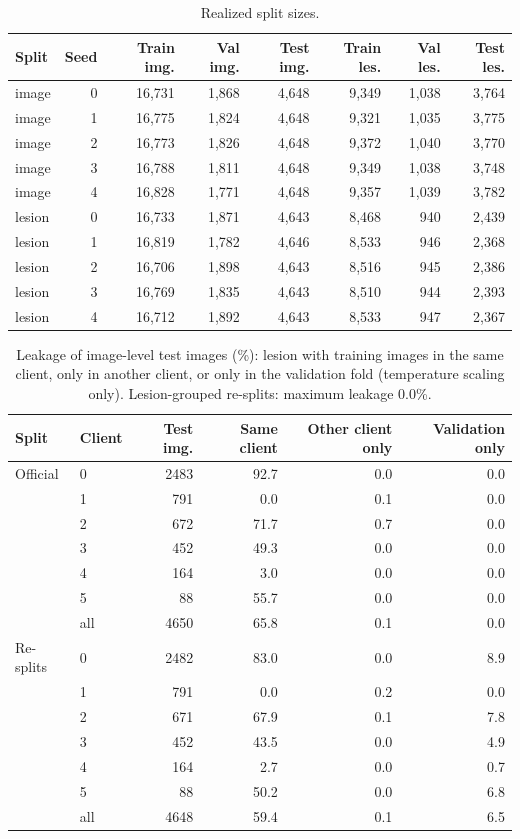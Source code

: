 \documentclass[10pt]{article}
\begin{document}
\begin{table}[!htbp]
\centering
\footnotesize
\caption{Realized split sizes.}
\label{tab:s1sizes}
\begin{tabular}{@{}lrrrrrrr@{}}
\toprule
Split & Seed & Train img. & Val img. & Test img. & Train les. & Val les. & Test les. \\
\midrule
image & 0 & 16,731 & 1,868 & 4,648 & 9,349 & 1,038 & 3,764 \\
image & 1 & 16,775 & 1,824 & 4,648 & 9,321 & 1,035 & 3,775 \\
image & 2 & 16,773 & 1,826 & 4,648 & 9,372 & 1,040 & 3,770 \\
image & 3 & 16,788 & 1,811 & 4,648 & 9,349 & 1,038 & 3,748 \\
image & 4 & 16,828 & 1,771 & 4,648 & 9,357 & 1,039 & 3,782 \\
lesion & 0 & 16,733 & 1,871 & 4,643 & 8,468 & 940 & 2,439 \\
lesion & 1 & 16,819 & 1,782 & 4,646 & 8,533 & 946 & 2,368 \\
lesion & 2 & 16,706 & 1,898 & 4,643 & 8,516 & 945 & 2,386 \\
lesion & 3 & 16,769 & 1,835 & 4,643 & 8,510 & 944 & 2,393 \\
lesion & 4 & 16,712 & 1,892 & 4,643 & 8,533 & 947 & 2,367 \\
\bottomrule
\end{tabular}
\end{table}
\begin{table}[!htbp]
\centering
\footnotesize
\caption{Leakage of image-level test images (\%): lesion with training images in the same client, only in another client, or only in the validation fold (temperature scaling only). Lesion-grouped re-splits: maximum leakage 0.0\%.}
\label{tab:s1leak}
\begin{tabular}{@{}llrrrr@{}}
\toprule
Split & Client & Test img. & Same client & Other client only & Validation only \\
\midrule
Official & 0 & 2483 & 92.7 & 0.0 & 0.0 \\
 & 1 & 791 & 0.0 & 0.1 & 0.0 \\
 & 2 & 672 & 71.7 & 0.7 & 0.0 \\
 & 3 & 452 & 49.3 & 0.0 & 0.0 \\
 & 4 & 164 & 3.0 & 0.0 & 0.0 \\
 & 5 & 88 & 55.7 & 0.0 & 0.0 \\
 & all & 4650 & 65.8 & 0.1 & 0.0 \\
\midrule
Re-splits & 0 & 2482 & 83.0 & 0.0 & 8.9 \\
 & 1 & 791 & 0.0 & 0.2 & 0.0 \\
 & 2 & 671 & 67.9 & 0.1 & 7.8 \\
 & 3 & 452 & 43.5 & 0.0 & 4.9 \\
 & 4 & 164 & 2.7 & 0.0 & 0.7 \\
 & 5 & 88 & 50.2 & 0.0 & 6.8 \\
 & all & 4648 & 59.4 & 0.1 & 6.5 \\
\bottomrule
\end{tabular}
\end{table}
\end{document}
